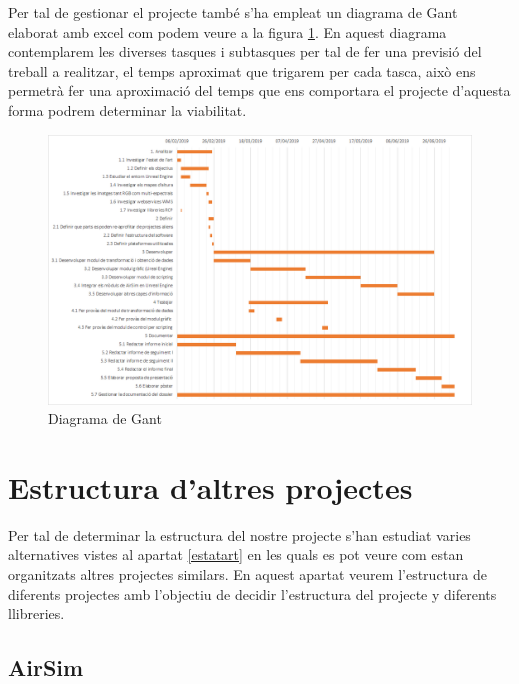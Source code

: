 \documentclass[10pt,a4paper]{article}
\begin{document}
Per tal de gestionar el projecte també s'ha empleat un diagrama de Gant elaborat amb excel com podem veure a la figura \ref{fig-gant}. En aquest diagrama contemplarem les diverses tasques i subtasques per tal de fer una previsió del treball a realitzar, el temps aproximat que trigarem per cada tasca, això ens permetrà fer una aproximació del temps que ens comportara el projecte d'aquesta forma podrem determinar la viabilitat.

\begin{figure}[!h]
\centering
  	\includegraphics[width=1\textwidth]{gant}
	\caption{Diagrama de Gant}
	\label{fig-gant}
\end{figure}


\section{Estructura d'altres projectes}

Per tal de determinar la estructura del nostre projecte s'han estudiat varies alternatives vistes al apartat \ref{estatart} en les quals es pot veure com estan organitzats altres projectes similars. En aquest apartat veurem l'estructura de diferents projectes amb l'objectiu de decidir l'estructura del projecte y diferents llibreries.

\subsection{AirSim} 
\end{document}
